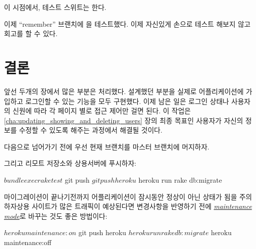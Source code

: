 {{\noindent 이 시점에서, 테스트 스위트는  한다. 


\noindent 이제 ``remember'' 브랜치에 을 테스트했다. 이제 자신있게 손으로 테스트 해보지 않고 회고를 할 수 있다. 

\section{결론} 

앞선 두개의 장에서 많은 부분은 처리했다. 설계했던 부분을 실제로 어플리케이션에 가입하고 로그인할 수 있는 기능을 모두 구현했다. 이제 남은 일은 로그인 상태나 사용자의 신원에 따라 각 페이지 별로 접근 제어만 걸면 된다. 이 작업은 \ref{cha:updating_showing_and_deleting_users} 장의 최종 목표인 사용자가 자신의 정보를 수정할 수 있도록 해주는 과정에서 해결될 것이다. 

다음으로 넘어가기 전에 우선 현재 브랜치를 마스터 브랜치에 머지하자. 


\noindent 그리고 리모트 저장소와 상용서버에 푸시하자: 

\begin{code} $ bundle exec rake test $ git push $ git push heroku $ heroku run rake db:migrate \end{code} 

\noindent 마이그레이션이 끝나기전까지 어플리케이션이 잠시동안 정상이 아닌 상태가 됨을 주의하자상용 사이트가 많은 트래픽이 예상된다면 변경사항을 반영하기 전에 \href{https://devcenter.heroku.com/articles/maintenance-mode}{\emph{maintenance mode}}로 바꾸는 것도 좋은 방법이다: 

\begin{code} $ heroku maintenance:on $ git push heroku $ heroku run rake db:migrate $ heroku maintenance:off \end{code} 

}}
